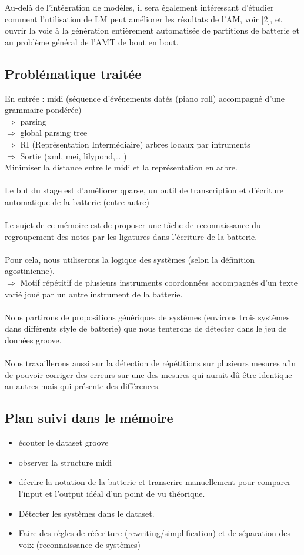 Au-delà de l'intégration de modèles, il sera également intéressant d'étudier comment l'utilisation de LM peut améliorer les résultats de l'AM, voir [2], et ouvrir la voie à la génération entièrement automatisée de partitions de batterie et au problème général de l'AMT de bout en bout.

\subsection*{Problématique traitée}	
	En entrée : midi (séquence d’événements datés (piano roll) accompagné d’une grammaire pondérée)\\
	$\Rightarrow$ parsing\\
	$\Rightarrow$ global parsing tree\\
	$\Rightarrow$ RI (Représentation Intermédiaire) arbres locaux par intruments\\
	$\Rightarrow$ Sortie (xml, mei, lilypond,… )\\
	Minimiser la distance entre le midi et la représentation en arbre.\\\\
	Le but du stage est d’améliorer qparse, un outil de transcription et d’écriture automatique de la batterie (entre autre)\\\\
	Le sujet de ce mémoire est de proposer une tâche de reconnaissance du regroupement des notes par les ligatures dans l’écriture de la batterie.\\\\
	Pour cela, nous utiliserons la logique des systèmes (selon la définition agostinienne).\\$\Rightarrow$ Motif répétitif de plusieurs instruments coordonnées accompagnés d’un texte varié joué par un autre instrument de la batterie.\\\\Nous partirons de propositions génériques de systèmes (environs trois systèmes dans différents style de batterie) que nous tenterons de détecter dans le jeu de données groove.\\\\
	Nous travaillerons aussi sur la détection de répétitions sur plusieurs mesures afin de pouvoir corriger des erreurs sur une des mesures qui aurait dû être identique au autres mais qui présente des différences.
	
\subsection*{Plan suivi dans le mémoire}
\begin{itemize}
	\item écouter le dataset groove
	\item observer la structure midi
	\item décrire la notation de la batterie et transcrire manuellement pour comparer l’input et l’output idéal d’un point de vu théorique.
	\item Détecter les systèmes dans le dataset.
	\item Faire des règles de réécriture (rewriting/simplification) et de séparation des voix (reconnaissance de systèmes)
\end{itemize}
	